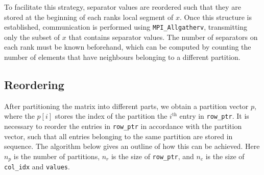 To facilitate this strategy, separator values are reordered such that they are stored at the beginning of each ranks local segment of \(x\). Once this structure is established, communication is performed using \texttt{MPI\_Allgatherv}, transmitting only the subset of \(x\) that contains separator values. The number of separators on each rank must be known beforehand, which can be computed by counting the number of elements that have neighbours belonging to a different partition.

\subsection{Reordering}
After partitioning the matrix into different parts, we obtain a partition vector \(p\), where the \(p[i]\) stores the index of the partition the \(i^{\text{th}}\) entry in \texttt{row\_ptr}. It is necessary to reorder the entries in \texttt{row\_ptr} in accordance with the partition vector, such that all entries belonging to the same partition are stored in sequence. The algorithm below gives an outline of how this can be achieved. Here \(n_{p}\) is the number of partitions, \(n_{r}\) is the size of \texttt{row\_ptr}, and \(n_{c}\) is the size of \texttt{col\_idx} and \texttt{values}.

